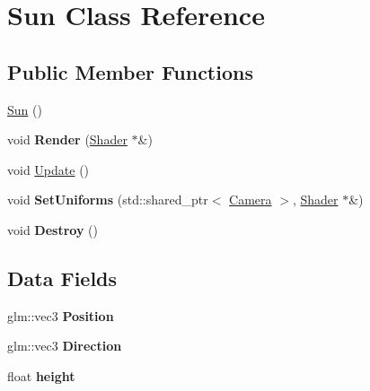 \hypertarget{class_sun}{}\section{Sun Class Reference}
\label{class_sun}
\subsection*{Public Member Functions}
\begin{DoxyCompactItemize}
\item 
\hyperlink{class_sun_aa3e508ffefb0cb76e55c2bdefdc907d1}{Sun} ()
\item 
void {\bfseries Render} (\hyperlink{class_shader}{Shader} $\ast$\&)\hypertarget{class_sun_a9860c6a85787ce7c0ed969ab5019464e}{}\label{class_sun_a9860c6a85787ce7c0ed969ab5019464e}

\item 
void \hyperlink{class_sun_a4b93a42883411f4287f91ba3d3dc73a5}{Update} ()
\item 
void {\bfseries Set\+Uniforms} (std\+::shared\+\_\+ptr$<$ \hyperlink{class_camera}{Camera} $>$, \hyperlink{class_shader}{Shader} $\ast$\&)\hypertarget{class_sun_afd8240c02aa75e6c8100261373b17eb6}{}\label{class_sun_afd8240c02aa75e6c8100261373b17eb6}

\item 
void {\bfseries Destroy} ()\hypertarget{class_sun_ab1a0a8319c3ba1ffcee2cda8c9e29ac1}{}\label{class_sun_ab1a0a8319c3ba1ffcee2cda8c9e29ac1}

\end{DoxyCompactItemize}
\subsection*{Data Fields}
\begin{DoxyCompactItemize}
\item 
glm\+::vec3 {\bfseries Position}\hypertarget{class_sun_a044e3f3e76daaf6a4dfdfaa2ced95694}{}\label{class_sun_a044e3f3e76daaf6a4dfdfaa2ced95694}

\item 
glm\+::vec3 {\bfseries Direction}\hypertarget{class_sun_ae3467f6ebc8f83f2cbbd49289693d967}{}\label{class_sun_ae3467f6ebc8f83f2cbbd49289693d967}

\item 
float {\bfseries height}\hypertarget{class_sun_a8fcdae88a34ab1b5279d394b5ce7c859}{}\label{class_sun_a8fcdae88a34ab1b5279d394b5ce7c859}

\end{DoxyCompactItemize}
